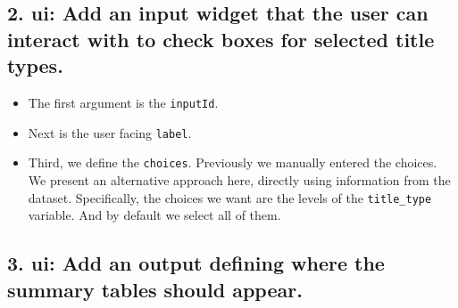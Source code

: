 \documentclass[
  letterpaper,
  DIV=11,
  numbers=noendperiod]{scrreprt}
\newenvironment{Shaded}{\begin{snugshade}}{\end{snugshade}}
\newcommand{\AttributeTok}[1]{\textcolor[rgb]{0.40,0.46,0.14}{#1}}
\newcommand{\CommentTok}[1]{\textcolor[rgb]{0.37,0.37,0.37}{#1}}
\newcommand{\FunctionTok}[1]{\textcolor[rgb]{0.28,0.35,0.67}{#1}}
\newcommand{\NormalTok}[1]{\textcolor[rgb]{0.00,0.46,0.62}{#1}}
\newcommand{\SpecialCharTok}[1]{\textcolor[rgb]{0.37,0.37,0.37}{#1}}
\newcommand{\StringTok}[1]{\textcolor[rgb]{0.13,0.47,0.30}{#1}}
\providecommand{\tightlist}{%
  \setlength{\itemsep}{0pt}\setlength{\parskip}{0pt}}
\begin{document}
\hypertarget{ui-add-an-input-widget-that-the-user-can-interact-with-to-check-boxes-for-selected-title-types.}{%
\subsection{\texorpdfstring{2. \textbf{ui}: Add an input widget that the
user can interact with to check boxes for selected title
types.}{2. ui: Add an input widget that the user can interact with to check boxes for selected title types.}}\label{ui-add-an-input-widget-that-the-user-can-interact-with-to-check-boxes-for-selected-title-types.}}

\begin{Shaded}
\end{Shaded}

\begin{itemize}
\tightlist
\item
  The first argument is the \texttt{inputId}.
\item
  Next is the user facing \texttt{label}.
\item
  Third, we define the \texttt{choices}. Previously we manually entered
  the choices. We present an alternative approach here, directly using
  information from the dataset. Specifically, the choices we want are
  the levels of the \texttt{title\_type} variable. And by default we
  select all of them.
\end{itemize}

\hypertarget{ui-add-an-output-defining-where-the-summary-tables-should-appear.}{%
\subsection{\texorpdfstring{3. \textbf{ui}: Add an output defining where
the summary tables should
appear.}{3. ui: Add an output defining where the summary tables should appear.}}\label{ui-add-an-output-defining-where-the-summary-tables-should-appear.}}
\end{document}
